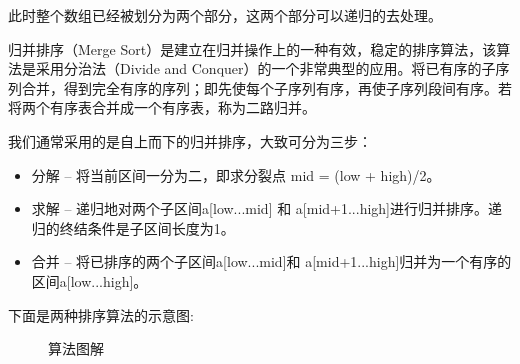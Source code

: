 \documentclass[UTF8]{ctexart}
\begin{document}
  此时整个数组已经被划分为两个部分，这两个部分可以递归的去处理。\par
  归并排序（Merge Sort）是建立在归并操作上的一种有效，稳定的排序算法，该算法是采用分治法（Divide and Conquer）的一个非常典型的应用。将已有序的子序列合并，得到完全有序的序列；即先使每个子序列有序，再使子序列段间有序。若将两个有序表合并成一个有序表，称为二路归并。\par
  我们通常采用的是自上而下的归并排序，大致可分为三步：
  \begin{itemize}
      \item 分解 -- 将当前区间一分为二，即求分裂点 mid = (low + high)/2。
      \item 求解 -- 递归地对两个子区间a[low...mid] 和 a[mid+1...high]进行归并排序。递归的终结条件是子区间长度为1。
      \item 合并 -- 将已排序的两个子区间a[low...mid]和 a[mid+1...high]归并为一个有序的区间a[low...high]。
  \end{itemize}
  \par
  下面是两种排序算法的示意图:
  \begin{figure}[htbp]
    \centering
    \caption{算法图解}
    \label{fig:label1}
    \end{figure}
\end{document}
